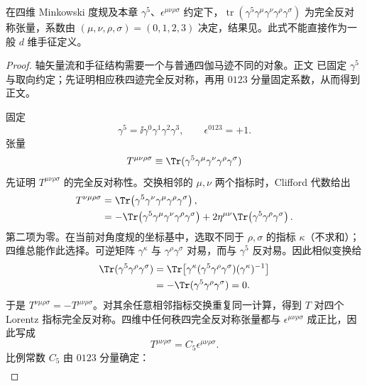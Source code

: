 \begin{lemma}
在四维 Minkowski 度规及本章 $\gamma^5$、$\epsilon^{\mu\nu\rho\sigma}$ 约定下，$\operatorname{tr}(\gamma^5\gamma^\mu\gamma^\nu\gamma^\rho\gamma^\sigma)$ 为完全反对称张量，系数由 $(\mu,\nu,\rho,\sigma)=(0,1,2,3)$ 决定，结果见。此式不能直接作为一般 $d$ 维手征定义。
\end{lemma}
\begin{proof}
轴矢量流和手征结构需要一个与普通四伽马迹不同的对象。正文 已固定 $\gamma^5$ 与取向约定；先证明相应秩四迹完全反对称，再用 $0123$ 分量固定系数，从而得到正文。



固定
\begin{equation*}
 \gamma^5=\ii\gamma^0\gamma^1\gamma^2\gamma^3,
 \qquad \epsilon^{0123}=+1.
\end{equation*}
张量
\begin{equation*}
 T^{\mu\nu\rho\sigma}
 \equiv\Tr(\gamma^5\gamma^\mu\gamma^\nu\gamma^\rho\gamma^\sigma)
\end{equation*}
先证明 $T^{\mu\nu\rho\sigma}$ 的完全反对称性。交换相邻的 $\mu,\nu$ 两个指标时，Clifford 代数给出
\begin{align*}
T^{\nu\mu\rho\sigma}
&=\Tr\!\left(\gamma^5\gamma^\nu\gamma^\mu\gamma^\rho\gamma^\sigma\right),\\
&=-\Tr\!\left(\gamma^5\gamma^\mu\gamma^\nu\gamma^\rho\gamma^\sigma\right)
+2\eta^{\mu\nu}\Tr\!\left(\gamma^5\gamma^\rho\gamma^\sigma\right).
\end{align*}
第二项为零。在当前对角度规的坐标基中，选取不同于 $\rho,\sigma$ 的指标 $\kappa$（不求和）；四维总能作此选择。可逆矩阵 $\gamma^\kappa$ 与 $\gamma^\rho\gamma^\sigma$ 对易，而与 $\gamma^5$ 反对易。因此相似变换给
\begin{align*}
\Tr(\gamma^5\gamma^\rho\gamma^\sigma)
&=\Tr\!\left[\gamma^\kappa(\gamma^5\gamma^\rho\gamma^\sigma)(\gamma^\kappa)^{-1}\right]\\
&=-\Tr(\gamma^5\gamma^\rho\gamma^\sigma)=0.
\end{align*}
于是
$T^{\nu\mu\rho\sigma}=-T^{\mu\nu\rho\sigma}$。对其余任意相邻指标交换重复同一计算，得到 $T$ 对四个 Lorentz 指标完全反对称。四维中任何秩四完全反对称张量都与 $\epsilon^{\mu\nu\rho\sigma}$ 成正比，因此写成
\begin{equation*}
T^{\mu\nu\rho\sigma}=C_5\epsilon^{\mu\nu\rho\sigma}.
\end{equation*}
比例常数 $C_5$ 由 $0123$ 分量确定：
\begin{align*}

\end{align*}
\end{proof}
